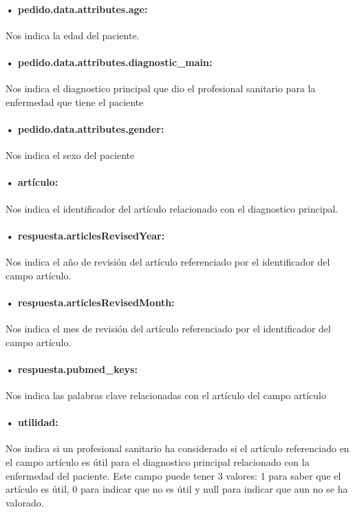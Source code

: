 \paragraph{• pedido.data.attributes.age:} Nos indica la edad del paciente.
\paragraph{• pedido.data.attributes.diagnostic\_main:} Nos indica el diagnostico principal que dio el profesional sanitario para la enfermedad que tiene el paciente
\paragraph{• pedido.data.attributes.gender:} Nos indica el sexo del paciente
\paragraph{• artículo:} Nos indica el identificador del artículo relacionado con el diagnostico principal.
\paragraph{• respuesta.articlesRevisedYear:} Nos indica el año de revisión del artículo referenciado por el identificador del campo artículo.
\paragraph{• respuesta.articlesRevisedMonth:} Nos indica el mes de revisión del artículo referenciado por el identificador del campo artículo.
\paragraph{• respuesta.pubmed\_keys:} Nos indica las palabras clave relacionadas con el artículo del campo artículo
\paragraph{• utilidad:} Nos indica si un profesional sanitario ha considerado si el artículo referenciado en el campo artículo es útil para el diagnostico principal relacionado con la enfermedad del paciente. Este campo puede tener 3 valores: 1 para saber que el artículo es útil, 0 para indicar que no es útil y null para indicar que aun no se ha valorado.